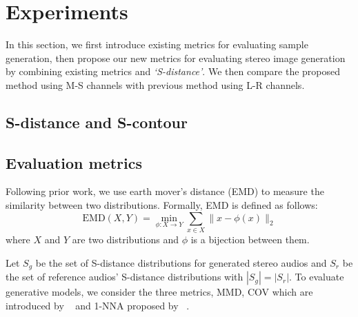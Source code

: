 \section{Experiments}
\label{sec:experiment}

In this section, we first introduce existing metrics for evaluating sample generation, then propose our new metrics for evaluating stereo image generation by combining existing metrics and \textit{`S-distance'}. We then compare the proposed method using M-S channels with previous method using L-R channels.

\subsection{S-distance and S-contour}
\label{subsec:s-distance}


\subsection{Evaluation metrics}
\label{subsec:metric}
Following prior work, we use earth mover's distance (EMD) to measure the similarity between two distributions. Formally, EMD is defined as follows:
\begin{equation}
    \text{EMD}(X,Y) = \min_{\phi: X\to Y} \sum_{x\in X} \|x-\phi(x)\|_2 \nonumber
\end{equation}
where $X$ and $Y$ are two distributions and $\phi$ is a bijection between them.


Let $S_g$ be the set of S-distance distributions for generated stereo audios and $S_r$ be the set of reference audios' S-distance distributions with $|S_g| = |S_r|$. To evaluate generative models, we consider the three metrics, MMD, COV which are introduced by ~\cite{achlioptas} and 1-NNA proposed by ~\cite{1-nna}.

